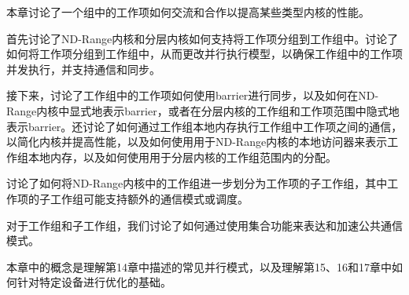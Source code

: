 本章讨论了一个组中的工作项如何交流和合作以提高某些类型内核的性能。\par

首先讨论了ND-Range内核和分层内核如何支持将工作项分组到工作组中。讨论了如何将工作项分组到工作组中，从而更改并行执行模型，以确保工作组中的工作项并发执行，并支持通信和同步。\par

接下来，讨论了工作组中的工作项如何使用barrier进行同步，以及如何在ND-Range内核中显式地表示barrier，或者在分层内核的工作组和工作项范围中隐式地表示barrier。还讨论了如何通过工作组本地内存执行工作组中工作项之间的通信，以简化内核并提高性能，以及如何使用用于ND-Range内核的本地访问器来表示工作组本地内存，以及如何使用用于分层内核的工作组范围内的分配。\par

讨论了如何将ND-Range内核中的工作组进一步划分为工作项的子工作组，其中工作项的子工作组可能支持额外的通信模式或调度。\par

对于工作组和子工作组，我们讨论了如何通过使用集合功能来表达和加速公共通信模式。\par

本章中的概念是理解第14章中描述的常见并行模式，以及理解第15、16和17章中如何针对特定设备进行优化的基础。\par


\newpage